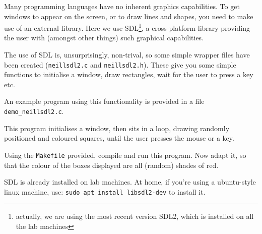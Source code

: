 
Many programming languages have no inherent graphics capabilities.
To get windows to appear on the screen, or to draw lines and shapes,
you need to make use of an external library. Here we use SDL\footnote{
actually, we are using the most recent version SDL2, which is installed
on all the lab machines}, a cross-platform library providing the user with
(amongst other things) such graphical capabilities.


The use of SDL is, unsurprisingly, non-trival, so some simple wrapper
files have been created (\verb^neillsdl2.c^ and \verb^neillsdl2.h^).
These give you some simple functions to initialise a window, draw
rectangles, wait for the user to press a key etc.

An example program using this functionality is
provided in a file \verb^demo_neillsdl2.c^.

This program initialises a window, then sits in a loop, drawing
randomly positioned and coloured squares, until the
user presses the mouse or a key. 

\begin{exercise}
Using the \verb^Makefile^ provided, compile and run this program.
Now adapt it, so that the colour of the boxes displayed are all
(random) shades of red.

SDL is already installed on lab machines. At home, if you're using a
ubuntu-style linux machine, use: \verb^sudo apt install libsdl2-dev^
to install it.
\end{exercise}

